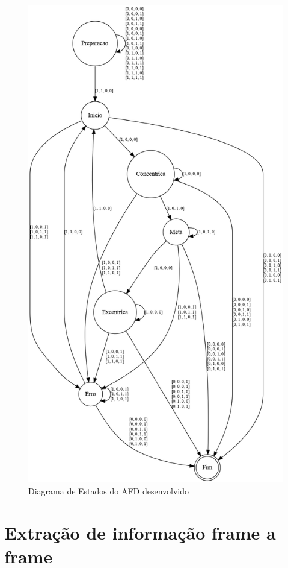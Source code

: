 \begin{figure}[!htb]
	\centering
	\includegraphics[scale=0.45]{figuras/AFD/afd_barra.png}
	\caption{Diagrama de Estados do AFD desenvolvido}
	\label{fig:transicaoAFD}
\end{figure}
\newpage

\section[Extração de informação frame a frame]{Extração de informação frame a frame}\label{sec:Extracao de informacao frame a frame}

